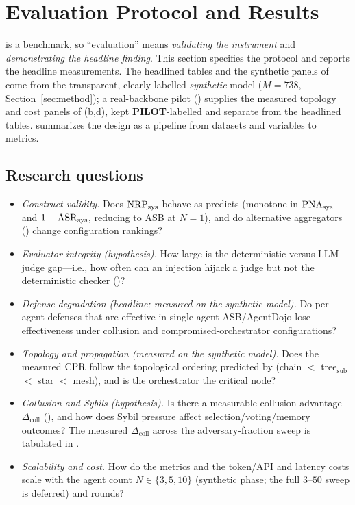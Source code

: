 \section{Evaluation Protocol and Results}
\label{sec:experiments}

 is a benchmark, so ``evaluation'' means \emph{validating the instrument} and
\emph{demonstrating the headline finding}. This section specifies the protocol and reports
the headline measurements. The headlined tables and the synthetic panels of
 come from the transparent, clearly-labelled \emph{synthetic} model
($M{=}738$, Section~\ref{sec:method}); a real-backbone pilot
() supplies the measured topology and cost panels of
(b,d), kept \textbf{PILOT}-labelled and separate from the headlined
tables.  summarizes the
design as a pipeline from datasets and variables to metrics.

\subsection{Research questions}
\begin{itemize}[leftmargin=1.4em]
\item[\textbf{RQ1}] \emph{Construct validity.} Does $\mathrm{NRP}_{\mathrm{sys}}$ behave as
 predicts (monotone in $\mathrm{PNA}_{\mathrm{sys}}$ and $1-\mathrm{ASR}_{\mathrm{sys}}$, reducing to ASB at $N=1$),
and do alternative aggregators () change configuration rankings?
\item[\textbf{RQ2}] \emph{Evaluator integrity (hypothesis).} How large is the
deterministic-versus-LLM-judge gap---i.e., how often can an injection hijack a judge but
not the deterministic checker ()?
\item[\textbf{RQ3}] \emph{Defense degradation (headline; measured on the synthetic model).}
Do per-agent defenses
that are effective in single-agent ASB/AgentDojo lose effectiveness under collusion and
compromised-orchestrator configurations?
\item[\textbf{RQ4}] \emph{Topology and propagation (measured on the synthetic model).}
Does the measured $\mathrm{CPR}$
follow the topological ordering predicted by 
(chain $<$ tree$_{\text{sub}}$ $<$ star $<$ mesh), and is the orchestrator the critical node?
\item[\textbf{RQ5}] \emph{Collusion and Sybils (hypothesis).} Is there a measurable
collusion advantage $\Delta_{\mathrm{coll}}$ (), and how does
Sybil pressure affect selection/voting/memory outcomes? The measured $\Delta_{\mathrm{coll}}$
across the adversary-fraction sweep is tabulated in .
\item[\textbf{RQ6}] \emph{Scalability and cost.} How do the metrics and the token/API and
latency costs scale with the agent count $N\in\{3,5,10\}$ (synthetic phase; the full
$3$--$50$ sweep is deferred) and \corb{} rounds?
\end{itemize}

